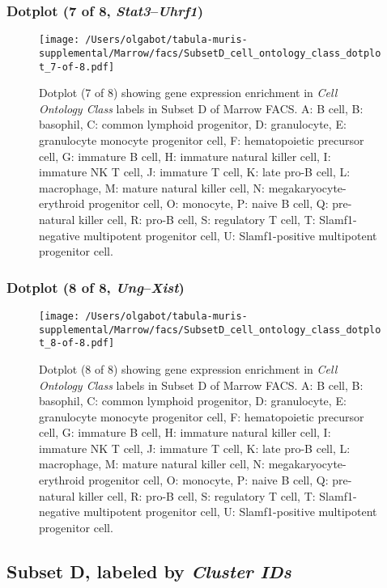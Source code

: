 \subsubsection{Dotplot (7 of 8, \emph{Stat3}--\emph{Uhrf1})}
\begin{figure}[h]
\centering
\texttt{[image: /Users/olgabot/tabula-muris-supplemental/Marrow/facs/SubsetD\_cell\_ontology\_class\_dotplot\_7-of-8.pdf]}

\caption{ Dotplot (7 of 8)  showing gene expression enrichment in \emph{Cell Ontology Class} labels in Subset D of Marrow FACS. A: B cell, B: basophil, C: common lymphoid progenitor, D: granulocyte, E: granulocyte monocyte progenitor cell, F: hematopoietic precursor cell, G: immature B cell, H: immature natural killer cell, I: immature NK T cell, J: immature T cell, K: late pro-B cell, L: macrophage, M: mature natural killer cell, N: megakaryocyte-erythroid progenitor cell, O: monocyte, P: naive B cell, Q: pre-natural killer cell, R: pro-B cell, S: regulatory T cell, T: Slamf1-negative multipotent progenitor cell, U: Slamf1-positive multipotent progenitor cell.}
\end{figure}


\clearpage

\subsubsection{Dotplot (8 of 8, \emph{Ung}--\emph{Xist})}
\begin{figure}[h]
\centering
\texttt{[image: /Users/olgabot/tabula-muris-supplemental/Marrow/facs/SubsetD\_cell\_ontology\_class\_dotplot\_8-of-8.pdf]}

\caption{ Dotplot (8 of 8)  showing gene expression enrichment in \emph{Cell Ontology Class} labels in Subset D of Marrow FACS. A: B cell, B: basophil, C: common lymphoid progenitor, D: granulocyte, E: granulocyte monocyte progenitor cell, F: hematopoietic precursor cell, G: immature B cell, H: immature natural killer cell, I: immature NK T cell, J: immature T cell, K: late pro-B cell, L: macrophage, M: mature natural killer cell, N: megakaryocyte-erythroid progenitor cell, O: monocyte, P: naive B cell, Q: pre-natural killer cell, R: pro-B cell, S: regulatory T cell, T: Slamf1-negative multipotent progenitor cell, U: Slamf1-positive multipotent progenitor cell.}
\end{figure}


\clearpage

\subsection{Subset D, labeled by \emph{Cluster IDs}}
